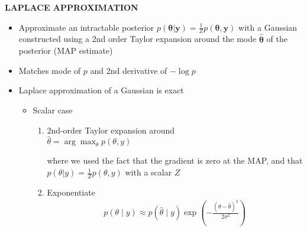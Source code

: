 \begin{whitebox}{\textbf{LAPLACE APPROXIMATION}}
    \begin{itemize}
        \item Approximate an intractable posterior $p(\bm{\theta}|\bm{y})=\frac{1}{Z}p(\bm{\theta},\bm{y})$ with a Gaussian constructed using a 2nd order Taylor expansion around the mode $\hat{\bm{\theta}}$ of the posterior (MAP estimate)
        \item Matches mode of $p$ and 2nd derivative of $-\log p$
        \item Laplace approximation of a Gaussian is exact
        \begin{itemize}
            \item Scalar case
            \begin{enumerate}
                \item 2nd-order Taylor expansion around\\
                $\hat{\theta}=\arg\max_\theta p(\theta,y)$
                \begin{center}
                \end{center}
                where we used the fact that the gradient is zero at the MAP, and that $p(\theta|y)=\frac{1}{Z}p(\theta,y)$ with a scalar $Z$
                \item Exponentiate
                \begin{align*}
                    p(\theta\mid y)\approx p(\hat{\theta}\mid y)\exp\left(-\frac{(\theta-\hat{\theta})^2}{2\sigma^2}\right)

\end{align*}
\end{enumerate}
\end{itemize}
\end{itemize}
\end{whitebox}

